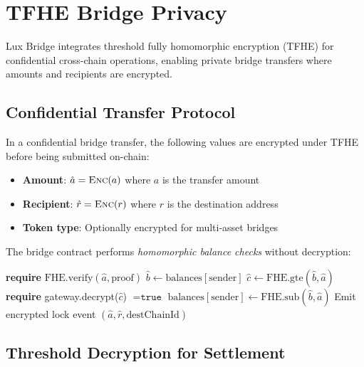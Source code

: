 \documentclass[11pt]{article}
\begin{document}
\section{TFHE Bridge Privacy}\label{sec:tfhe}

Lux Bridge integrates threshold fully homomorphic encryption (TFHE) for confidential cross-chain operations, enabling private bridge transfers where amounts and recipients are encrypted.

\subsection{Confidential Transfer Protocol}

In a confidential bridge transfer, the following values are encrypted under TFHE before being submitted on-chain:

\begin{itemize}[leftmargin=1.1em]
  \item \textbf{Amount}: $\hat{a} = \textsc{Enc}(a)$ where $a$ is the transfer amount
  \item \textbf{Recipient}: $\hat{r} = \textsc{Enc}(r)$ where $r$ is the destination address
  \item \textbf{Token type}: Optionally encrypted for multi-asset bridges
\end{itemize}

The bridge contract performs \emph{homomorphic balance checks} without decryption:

\begin{algorithm}[H]
\caption{Confidential Bridge Lock}
\begin{algorithmic}[1]
    \State \textbf{require} $\text{FHE.verify}(\hat{a}, \text{proof})$ 
    \State $\hat{b} \gets \text{balances}[\text{sender}]$ 
    \State $\hat{c} \gets \text{FHE.gte}(\hat{b}, \hat{a})$ 
    \State \textbf{require} gateway.decrypt($\hat{c}$) $= \texttt{true}$ 
    \State $\text{balances}[\text{sender}] \gets \text{FHE.sub}(\hat{b}, \hat{a})$
    \State Emit encrypted lock event $(\hat{a}, \hat{r}, \text{destChainId})$
\EndFunction
\end{algorithmic}
\end{algorithm}

\subsection{Threshold Decryption for Settlement}
\end{document}
